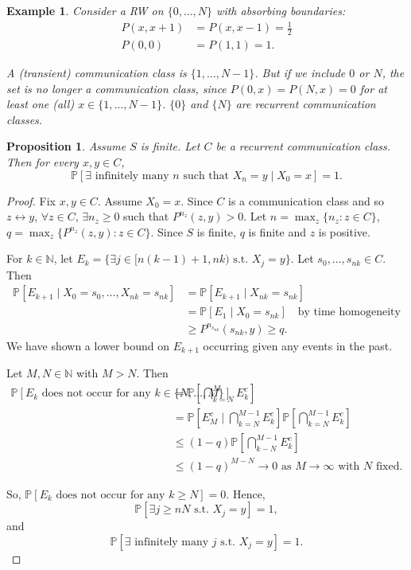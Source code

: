 \documentclass{tufte-handout}
\newcommand*\N{\mathbb{N}}
\renewcommand*\P{\mathbb{P}}
\newtheorem{ex}[thm]{Example}
\newtheorem{prop}[thm]{Proposition}
\theoremstyle{definition}
\begin{document}
\begin{ex}
	Consider a RW on $\{0,\ldots,N\}$ with absorbing boundaries:
	\begin{align*}
		P(x,x+1) &= P(x,x-1) = \frac{1}{2} \\
		P(0,0) &= P(1,1) = 1
	.\end{align*}

	A (transient) communication class is $\{1,\ldots,N-1\}$. But if we include $0$ or $N$, the set is no longer a communication class, since $P(0,x) = P(N,x) = 0$ for at least one (all) $x \in \{1,\ldots,N-1\}$.
	$\{0\}$ and $\{N\}$ are recurrent communication classes.
\end{ex}

\begin{prop}
	Assume $S$ is finite. Let $C$ be a recurrent communication class. Then for every $x,y \in C$, \[
		\P\left[\exists \text{ infinitely many } n \text{ such that } X_n = y \mid X_0 = x\right] = 1
	.\] 	
\end{prop}

\begin{proof}
	Fix $x,y \in C$. Assume $X_0 = x$.
	Since $C$ is a communication class and so $z \leftrightarrow y$, $\forall z \in C$, $\exists n_z \ge 0$ such that $P^{n_z}(z,y) > 0$. Let $n = \max_{z} \{n_z: z \in C\}$, $q = \max_z \{P^{n_z}(z,y) : z \in C\}$. Since $S$ is finite, $q$ is finite and $z$ is positive.

	For $k \in \N$, let $E_k = \{\exists  j \in [n(k-1)+1, nk) \text{ s.t. } X_j = y\}$. Let $s_0,\ldots,s_{nk} \in C$. Then 
	\begin{align*}
		\P\left[E_{k+1} \mid X_0 = s_0, \ldots, X_{nk} = s_{nk}\right] &= \P\left[E_{k+1} \mid X_{nk} = s_{nk}\right]  \\
		&= \P\left[E_1 \mid X_0 = s_{nk}\right]  \quad \text{by time homogeneity} \\
		&\ge P^{n_{s_{nk}}}(s_{nk},y) \ge q
	.\end{align*}
	We have shown a lower bound on $E_{k+1}$ occurring given any events in the past.

	Let $M,N \in \N$ with $M > N$. Then
	\begin{align*}
		\P\left[E_k \text{ does not occur for any } k \in \{N,\ldots,M\}\right] &= \P\left[\bigcap\limits_{k=N}^{M} E_k^{c}	\right]   \\
		&= \P\left[E_M^c \mid \bigcap\limits_{k=N}^{M-1} E_k^c\right] \P\left[\bigcap\limits_{k=N}^{M-1} E_k^c\right]  \\	
		&\le (1-q) \P\left[\bigcap\limits_{k-N}^{M-1} E_k^c\right] \\
		&\le (1-q)^{M-N} \to 0 \text{ as } M \to \infty \text{ with } N \text{ fixed}
	.\end{align*}

	So, $\P\left[E_k \text{ does not occur for any }k \ge N\right] = 0$. Hence, \[
		\P\left[\exists  j \ge nN \text{ s.t. } X_j = y\right] = 1
	,\] and \[
	\P\left[\exists  \text{ infinitely many }j \text{ s.t. } X_j = y\right] = 1
	.\] 
\end{proof}
\end{document}
